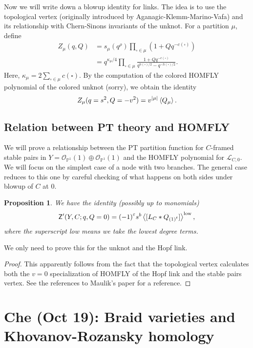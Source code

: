 \documentclass[leqno, openany]{memoir}
\newtheorem{prop}[thm]{Proposition}
\theoremstyle{definition}
\theoremstyle{remark}
\theoremstyle{plain}
\theoremstyle{definition}
\theoremstyle{remark}
\renewcommand{\P}{\mathbb{P}}
\newcommand{\ep}{\varepsilon}
\newcommand{\mc}[1]{\mathcal{#1}}
\newcommand{\mr}[1]{\mathrm{#1}}
\newcommand{\ms}[1]{\mathsf{#1}}
\newcommand{\1}{\mathbf{1}}
\newcommand{\2}{\mathbf{2}}
\newcommand{\3}{\mathbf{3}}
\begin{document}
Now we will write down a blowup identity for links. The idea is to use the topological vertex (originally introduced by Aganagic-Klemm-Marino-Vafa) and its relationship with Chern-Sinons invariants of the unknot. For a partition $\mu$, define
\begin{align*}
    Z_{\mu}(q, Q) &= s_{\mu}(q^{\rho}) \prod_{\square \in \mu} (1 + Q q^{-c(\square)}) \\
    &= q^{\kappa_{\mu}/4} \prod_{\square \in \mu} \frac{1 + Q q^{-c(\square)}}{q^{h(\square)/2} - q^{-h(\square)/2}}.
\end{align*}
Here, $\kappa_{\mu} = 2 \sum_{\square \in \mu} c(\square)$. By the computation of the colored HOMFLY polynomial of the colored unknot (sorry), we obtain the identity
\begin{align*}
    Z_{\mu}(q=s^2, Q=-v^2) = v^{\abs{\mu}} \ev{Q_{\mu}}.
\end{align*}

\section{Relation between PT theory and HOMFLY}%
\label{sec:relation_between_pt_theory_and_homfly}

We will prove a relationship between the PT partition function for $C$-framed stable pairs in $Y = \mc{O}_{\P^1}(1) \oplus \mc{O}_{\P^1}(1)$ and the HOMFLY polynomial for $\mc{L}_{C,0}$. We will focus on the simplest case of a node with two branches. The general case reduces to this one by careful checking of what happens on both sides under blowup of $C$ at $0$.

\begin{prop}
    We have the identity (possibly up to monomials)
    \[ \ms{Z}'(Y, C; q, Q=0) = {(-1)}^{\ep} s^b \ev{[L_C * Q_{{(1)}^t}]}^{\mr{low}}, \]
    where the superscript low means we take the lowest degree terms.
\end{prop}

We only need to prove this for the unknot and the Hopf link.

\begin{proof}
    This apparently follows from the fact that the topological vertex calculates both the $v=0$ specialization of HOMFLY of the Hopf link and the stable pairs vertex. See the references to Maulik's paper for a reference.
\end{proof}

\chapter{Che (Oct 19): Braid varieties and Khovanov-Rozansky homology}%
\label{cha:che_oct_19_braid_varieties_and_khovanov_rozansky_homology}
\end{document}
